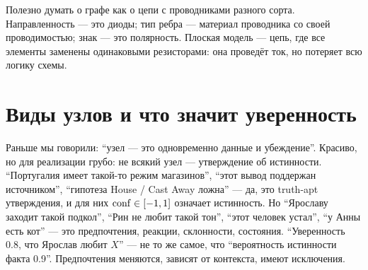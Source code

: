 \begin{intuition}
Полезно думать о графе как о цепи с проводниками разного сорта.
Направленность --- это диоды; тип ребра --- материал проводника со своей
проводимостью; знак --- это полярность. Плоская модель --- цепь, где все
элементы заменены одинаковыми резисторами: она проведёт ток, но потеряет всю
логику схемы.
\end{intuition}

\begin{center}
\label{fig:cup}
\end{center}

\section{Виды узлов и что значит уверенность}
\label{sec:nodekind}

Раньше мы говорили: ``узел --- это одновременно данные и убеждение''. Красиво,
но для реализации грубо: не всякий узел --- утверждение об истинности.
``Португалия имеет такой-то режим магазинов'', ``этот вывод поддержан
источником'', ``гипотеза House / Cast Away ложна'' --- да, это truth-apt
утверждения, и для них $\mathrm{conf} \in [-1, 1]$ означает истинность. Но
``Ярославу заходит такой подкол'', ``Рин не любит такой тон'', ``этот человек
устал'', ``у Анны есть кот'' --- это предпочтения, реакции, склонности,
состояния. ``Уверенность 0.8, что Ярослав любит $X$'' --- не то же самое, что
``вероятность истинности факта 0.9''. Предпочтения меняются, зависят от
контекста, имеют исключения.

